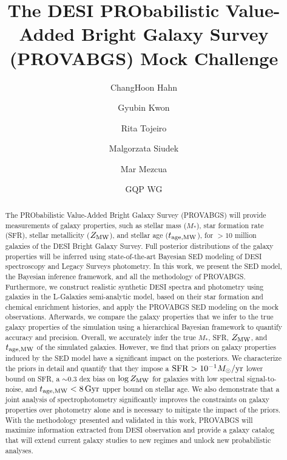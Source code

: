 \documentclass[12pt, letterpaper, preprint]{aastex63}
\begin{document}
 \sloppy\sloppypar\frenchspacing 

\title{The DESI PRObabilistic Value-Added Bright Galaxy Survey (PROVABGS) Mock Challenge} 

\author{ChangHoon Hahn}

\author{Gyubin Kwon}

\author{Rita Tojeiro}

\author{Malgorzata Siudek} 

\author{Mar Mezcua}

\author{GQP WG}

\begin{abstract}
    The PRObabilistic Value-Added Bright Galaxy Survey (PROVABGS) will provide
    measurements of galaxy properties, such as stellar mass ($M_*$), star
    formation rate (SFR), stellar metallicity ($Z_{\rm MW}$), and stellar age
    ($t_{\rm age, MW}$), for ${>}10$ million galaxies of the DESI Bright Galaxy
    Survey.
    Full posterior distributions of the galaxy properties will be inferred
    using state-of-the-art Bayesian SED modeling of DESI spectroscopy and
    Legacy Surveys photometry.
    In this work, we present the SED model, the Bayesian inference framework,
    and all the methodology of PROVABGS. 
    Furthermore, we construct realistic synthetic DESI spectra and photometry
    using galaxies in the {\sc L-Galaxies} semi-analytic model, based on their
    star formation and chemical enrichment histories, and apply the PROVABGS
    SED modeling on the mock observations.
    Afterwards, we compare the galaxy properties that we infer to the true
    galaxy properties of the simulation using a hierarchical Bayesian framework
    to quantify accuracy and precision. 
    Overall, we accurately infer the true $M_*$, SFR, $Z_{\rm MW}$, and 
    $t_{\rm age, MW}$ of the simulated galaxies. 
    However, we find that priors on galaxy properties induced by the SED model
    have a significant impact on the posteriors. 
    We characterize the priors in detail and quantify that they impose a 
    ${\rm SFR} > 10^{-1} M_\odot/{\rm yr}$ lower bound on SFR, a ${\sim}0.3$
    dex bias on $\log Z_{\rm MW}$ for galaxies with low spectral
    signal-to-noise, and $t_{\rm age, MW} < 8\,{\rm Gyr}$ upper bound on
    stellar age. 
    We also demonstrate that a joint analysis of spectrophotometry
    significantly improves the constraints on galaxy properties over photometry
    alone and is necessary to mitigate the impact of the priors. 
    With the methodology presented and validated in this work, PROVABGS will
    maximize information extracted from DESI observation and provide a galaxy
    catalog that will extend current galaxy studies to new regimes and unlock 
    new probabilistic analyses.
\end{abstract}
\end{document}
